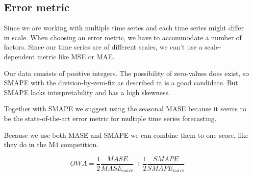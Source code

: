 \subsection{Error metric}



Since we are working with multiple time series and each time series might differ in scale.
When choosing an error metric, we have to accommodate a number of factors.
Since our time series are of different scales, we can't use a scale-dependent metric
like MSE or MAE.

Our data consists of positive integers. The possibility of zero-values does exist,
so SMAPE with the division-by-zero-fix as described in  is a good candidate.
But SMAPE lacks interpretability and has a high skewness.

Together with SMAPE we suggest using the seasonal MASE because it seems to be the
state-of-the-art error metric for multiple time series forecasting.

Because we use both MASE and SMAPE we can combine them to one score, like
they do in the M4 competition.

\begin{equation}
  \label{eq:OWA}
  OWA = \frac{1}{2} \frac{MASE}{MASE_{\text{naive}}} + \frac{1}{2} \frac{SMAPE}{SMAPE_{\text{naive}}}
\end{equation}
